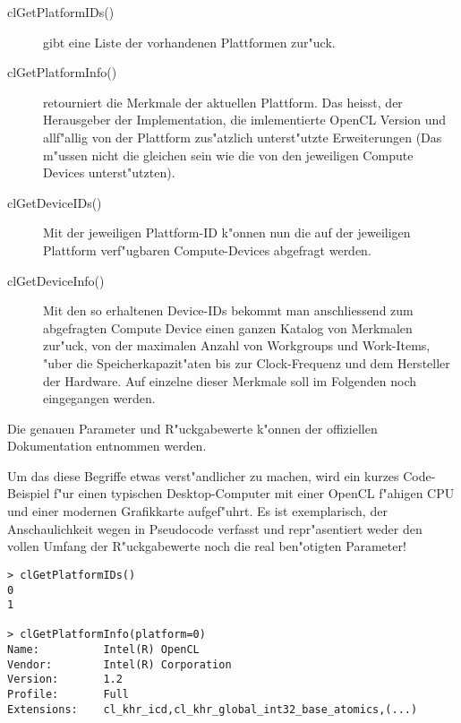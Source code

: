 \begin{refsection}
\begin{description}
 \item [clGetPlatformIDs()] gibt eine Liste der vorhandenen Plattformen zur"uck.
 \item [clGetPlatformInfo()] retourniert die Merkmale der aktuellen Plattform. Das heisst,
                            der Herausgeber der Implementation, die imlementierte 
                            OpenCL Version und allf"allig von der Plattform 
                            zus"atzlich unterst"utzte Erweiterungen (Das m"ussen
                            nicht die gleichen sein wie die von den jeweiligen
                            Compute Devices unterst"utzten).
 \item [clGetDeviceIDs()]   Mit der jeweiligen Plattform-ID k"onnen nun die auf der 
                            jeweiligen Plattform verf"ugbaren Compute-Devices abgefragt 
                            werden.
 \item [clGetDeviceInfo()]  Mit den so erhaltenen Device-IDs bekommt man anschliessend 
                            zum abgefragten Compute Device einen ganzen Katalog von
                            Merkmalen zur"uck, von der maximalen Anzahl von Workgroups
                            und Work-Items, "uber die Speicherkapazit"aten bis zur 
                            Clock-Frequenz und dem Hersteller der Hardware. Auf einzelne 
                            dieser Merkmale soll im Folgenden noch eingegangen werden.
\end{description}

\noindent Die genauen Parameter und R"uckgabewerte k"onnen der offiziellen
Dokumentation \cite{crypto:opencl_ref} entnommen werden.

Um das diese Begriffe etwas verst"andlicher zu machen, wird ein kurzes
Code-Beispiel f"ur einen typischen Desktop-Computer mit einer OpenCL f"ahigen
CPU und einer modernen Grafikkarte aufgef"uhrt. Es ist exemplarisch, der
Anschaulichkeit wegen in Pseudocode verfasst und repr"asentiert weder den vollen
Umfang der R"uckgabewerte noch die real ben"otigten Parameter!

\begin{small}
\begin{verbatim}
> clGetPlatformIDs()
0
1

> clGetPlatformInfo(platform=0)
Name:          Intel(R) OpenCL
Vendor:        Intel(R) Corporation
Version:       1.2
Profile:       Full
Extensions:    cl_khr_icd,cl_khr_global_int32_base_atomics,(...)


\end{verbatim}
\end{small}
\end{refsection}

